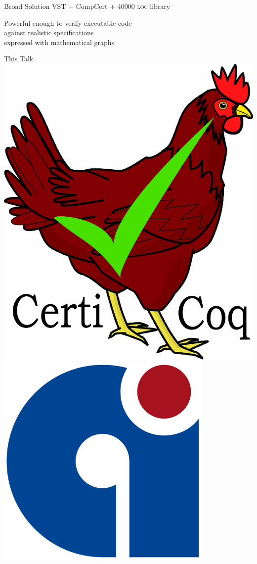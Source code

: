 \documentclass[usenames, xcolor=dvipsnames]{beamer}
\begin{document}
\begin{frame}{Broad Solution}
\bigskip
VST + CompCert + 40000 \textsc{loc} library

\pause
\bigskip
Powerful enough to verify \alert{executable code}
\\\hspace{1em}against \alert{realistic specifications}
\\\hspace{2em}expressed with \alert{mathematical graphs}

\pause 
\bigskip
{}
\end{frame}

\begin{frame}{This Talk}
\includegraphics[scale=0.02]{certicoq_logo} 
\hspace{2em} \includegraphics[scale=0.12]{compcert_logo}


\end{frame}
\end{document}
